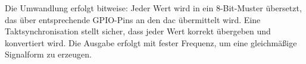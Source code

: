 Die Umwandlung erfolgt bitweise: Jeder Wert wird in ein 8-Bit-Muster übersetzt, das über entsprechende GPIO-Pins an den \gls{dac} übermittelt wird. Eine Taktsynchronisation stellt sicher, dass jeder Wert korrekt übergeben und konvertiert wird. Die Ausgabe erfolgt mit fester Frequenz, um eine gleichmäßige Signalform zu erzeugen.

